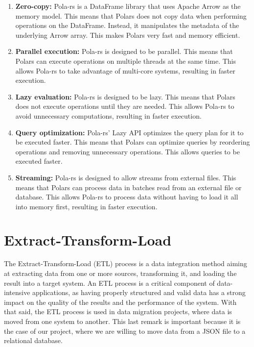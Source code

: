 \begin{enumerate}
    \itemsep1em
    \item \textbf{Zero-copy:} Pola-rs is a DataFrame library that uses Apache Arrow as the memory model. This means that Polars does not copy data when performing operations on the DataFrame. Instead, it manipulates the metadata of the underlying Arrow array. This makes Polars very fast and memory efficient.
    \item \textbf{Parallel execution:} Pola-rs is designed to be parallel. This means that Polars can execute operations on multiple threads at the same time. This allows Pola-rs to take advantage of multi-core systems, resulting in faster execution.
    \item \textbf{Lazy evaluation:} Pola-rs is designed to be lazy. This means that Polars does not execute operations until they are needed. This allows Pola-rs to avoid unnecessary computations, resulting in faster execution.
    \item \textbf{Query optimization:} Pola-rs' Lazy API optimizes the query plan for it to be executed faster. This means that Polars can optimize queries by reordering operations and removing unnecessary operations. This allows queries to be executed faster.
    \item \textbf{Streaming:} Pola-rs is designed to allow streams from external files. This means that Polars can process data in batches read from an external file or database. This allows Pola-rs to process data without having to load it all into memory first, resulting in faster execution.
\end{enumerate}

\section{Extract-Transform-Load}

The Extract-Transform-Load (ETL) process is a data integration method aiming at extracting data from one or more sources, transforming it, and loading the result into a target system. An ETL process is a critical component of data-intensive applications, as having properly structured and valid data has a strong impact on the quality of the results and the performance of the system. With that said, the ETL process is used in data migration projects, where data is moved from one system to another. This last remark is important because it is the case of our project, where we are willing to move data from a JSON file to a relational database.

